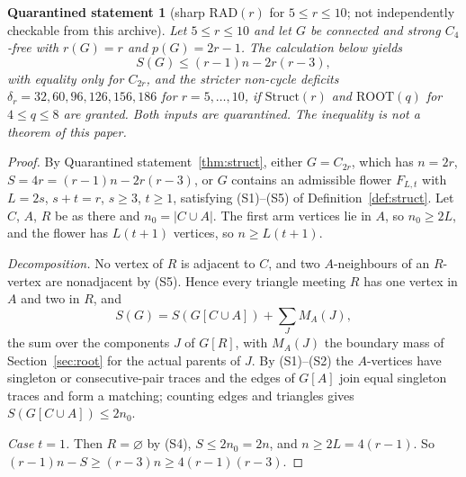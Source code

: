 \documentclass[11pt]{amsart}
\newtheorem{qrecord}[theorem]{Quarantined statement}
\theoremstyle{definition}
\theoremstyle{remark}
\newcommand{\pp}{p}
\newcommand{\RAD}{\mathrm{RAD}}
\newcommand{\ROOT}{\mathrm{ROOT}}
\begin{document}
\begin{qrecord}[sharp $\RAD(r)$ for $5\le r\le10$; not independently checkable from this archive]\label{thm:radsharp}
Let $5\le r\le10$ and let $G$ be connected and strong $C_4$-free with $r(G)=r$ and $\pp(G)=2r-1$. The calculation below yields
\[
S(G)\le(r-1)n-2r(r-3),
\]
with equality only for $C_{2r}$, and the stricter non-cycle deficits $\delta_r=32,60,96,126,156,186$ for $r=5,\dots,10$, if $\mathrm{Struct}(r)$ and $\ROOT(q)$ for $4\le q\le 8$ are granted. Both inputs are quarantined. The inequality is not a theorem of this paper.
\end{qrecord}

\begin{proof}
By Quarantined statement~\ref{thm:struct}, either $G=C_{2r}$, which has $n=2r$, $S=4r=(r-1)n-2r(r-3)$, or $G$ contains an admissible flower $F_{L,t}$ with $L=2s$, $s+t=r$, $s\ge3$, $t\ge1$, satisfying (S1)--(S5) of Definition~\ref{def:struct}. Let $C$, $A$, $R$ be as there and $n_0=|C\cup A|$. The first arm vertices lie in $A$, so $n_0\ge2L$, and the flower has $L(t+1)$ vertices, so $n\ge L(t+1)$.

\emph{Decomposition.} No vertex of $R$ is adjacent to $C$, and two $A$-neighbours of an $R$-vertex are nonadjacent by (S5). Hence every triangle meeting $R$ has one vertex in $A$ and two in $R$, and
\[
S(G)=S(G[C\cup A])+\sum_J M_A(J),
\]
the sum over the components $J$ of $G[R]$, with $M_A(J)$ the boundary mass of Section~\ref{sec:root} for the actual parents of $J$. By (S1)--(S2) the $A$-vertices have singleton or consecutive-pair traces and the edges of $G[A]$ join equal singleton traces and form a matching; counting edges and triangles gives $S(G[C\cup A])\le2n_0$.

\emph{Case $t=1$.} Then $R=\varnothing$ by (S4), $S\le2n_0=2n$, and $n\ge2L=4(r-1)$. So $(r-1)n-S\ge(r-3)n\ge4(r-1)(r-3)$.


\end{proof}
\end{document}
